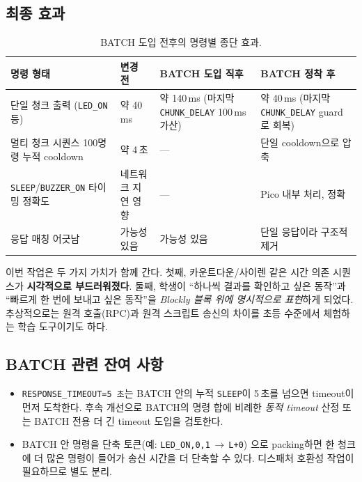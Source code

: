 \documentclass[11pt, oneside]{article}
\begin{document}
\subsection{최종 효과}

\begin{table}[h]
\centering
\small
\begin{tabularx}{\linewidth}{@{}lXXX@{}}
\toprule
명령 형태 & 변경 전 & BATCH 도입 직후 & BATCH 정착 후 \\
\midrule
단일 청크 출력 (\texttt{LED\_ON} 등) & 약 40\,ms & 약 140\,ms (마지막 \texttt{CHUNK\_DELAY} 100\,ms 가산) & 약 40\,ms (마지막 \texttt{CHUNK\_DELAY} guard로 회복) \\
멀티 청크 시퀀스 100명령 누적 cooldown & 약 4\,초 & --- & 단일 cooldown으로 압축 \\
\texttt{SLEEP}/\texttt{BUZZER\_ON} 타이밍 정확도 & 네트워크 지연 영향 & --- & Pico 내부 처리, 정확 \\
응답 매칭 어긋남 & 가능성 있음 & 가능성 있음 & 단일 응답이라 구조적 제거 \\
\bottomrule
\end{tabularx}
\caption{BATCH 도입 전후의 명령별 종단 효과.}
\end{table}

\begin{keypoint}
이번 작업은 두 가지 가치가 함께 간다. 첫째, 카운트다운/사이렌 같은 시간
의존 시퀀스가 \textbf{시각적으로 부드러워졌다}. 둘째, 학생이 ``하나씩 결과를
확인하고 싶은 동작''과 ``빠르게 한 번에 보내고 싶은 동작''을 \emph{Blockly
블록 위에 명시적으로 표현}하게 되었다. 추상적으로는 원격 호출(RPC)과 원격
스크립트 송신의 차이를 초등 수준에서 체험하는 학습 도구이기도 하다.
\end{keypoint}

\subsection{BATCH 관련 잔여 사항}

\begin{itemize}
  \item \texttt{RESPONSE\_TIMEOUT=5\,초}는 BATCH 안의 누적 \texttt{SLEEP}이
        5\,초를 넘으면 timeout이 먼저 도착한다. 후속 개선으로 BATCH의 명령
        합에 비례한 \emph{동적 timeout} 산정 또는 BATCH 전용 더 긴 timeout
        도입을 검토한다.
  \item BATCH 안 명령을 단축 토큰(예: \texttt{LED\_ON,0,1}\,$\rightarrow$\,\texttt{L+0})
        으로 packing하면 한 청크에 더 많은 명령이 들어가 송신 시간을 더
        단축할 수 있다. 디스패처 호환성 작업이 필요하므로 별도 분리.
\end{itemize}
\end{document}
